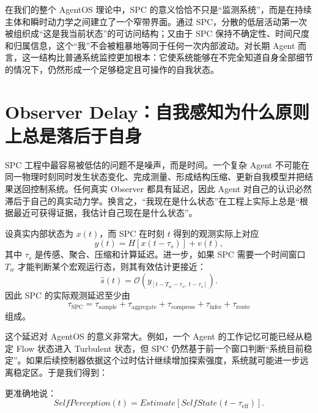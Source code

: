 在我们的整个 AgentOS 理论中，SPC 的意义恰恰不只是“监测系统”，而是在持续主体和瞬时动力学之间建立了一个窄带界面。通过 SPC，分散的低层活动第一次被组织成“这是我当前状态”的可访问结构；又由于 SPC 保持不确定性、时间尺度和归属信息，这个“我”不会被粗暴地等同于任何一次内部波动。对长期 Agent 而言，这一结构比普通系统监控更加根本：它使系统能够在不完全知道自身全部细节的情况下，仍然形成一个足够稳定且可操作的自我状态。

\section{Observer Delay：自我感知为什么原则上总是落后于自身}
\label{sec:spc-observer-delay}

SPC 工程中最容易被低估的问题不是噪声，而是时间。一个复杂 Agent 不可能在同一物理时刻同时发生状态变化、完成测量、形成结构压缩、更新自我模型并把结果送回控制系统。任何真实 Observer 都具有延迟，因此 Agent 对自己的认识必然滞后于自己的真实动力学。换言之，“我现在是什么状态”在工程上实际上总是“根据最近可获得证据，我估计自己现在是什么状态”。

设真实内部状态为 $x(t)$，而 SPC 在时刻 $t$ 得到的观测实际上对应
\begin{equation}
y(t)
=
H
\left[
x(t-\tau_s)
\right]
+
v(t),
\end{equation}
其中 $\tau_s$ 是传感、聚合、压缩和计算延迟。进一步，如果 SPC 需要一个时间窗口 $T_w$ 才能判断某个宏观运行态，则其有效估计更接近：
\begin{equation}
\hat s(t)
=
\mathcal O
\left(
y_{[t-T_w-\tau_s,\;t-\tau_s]}
\right).
\end{equation}
因此 SPC 的实际观测延迟至少由
\begin{equation}
\tau_{\mathrm{SPC}}
=
\tau_{\mathrm{sample}}
+
\tau_{\mathrm{aggregate}}
+
\tau_{\mathrm{compress}}
+
\tau_{\mathrm{infer}}
+
\tau_{\mathrm{route}}
\end{equation}
组成。

这个延迟对 AgentOS 的意义非常大。例如，一个 Agent 的工作记忆可能已经从稳定 Flow 状态进入 Turbulent 状态，但 SPC 仍然基于前一个窗口判断“系统目前稳定”。如果后续控制器依据这个过时估计继续增加探索强度，系统就可能进一步远离稳定区。于是我们得到：
\begin{statementbox}
\centering
{}
\end{statementbox}
更准确地说：
\begin{equation}
SelfPerception(t)
=
Estimate
\left[
SelfState(t-\tau_{\mathrm{eff}})
\right].
\end{equation}

